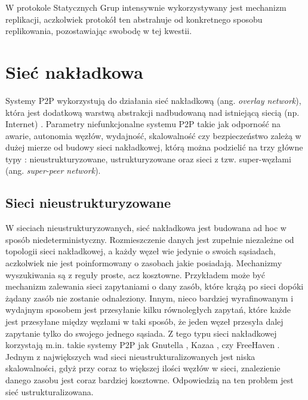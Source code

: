 \documentclass[12pt, twoside, openany]{report}
\begin{document}
W protokole Statycznych Grup intensywnie wykorzystywany jest mechanizm replikacji, aczkolwiek protokół ten abstrahuje od konkretnego sposobu replikowania, pozostawiając swobodę w tej kwestii.


\section{Sieć nakładkowa}
Systemy P2P wykorzystują do działania sieć nakładkową (ang. \textit{overlay network}), która jest dodatkową warstwą abstrakcji nadbudowaną nad istniejącą siecią (np. Internet) \cite{bib:martins, bib:kobusinska}. Parametry niefunkcjonalne systemu P2P takie jak odporność na awarie, autonomia węzłów, wydajność, skalowalność czy bezpieczeństwo zależą w dużej mierze od budowy sieci nakładkowej, którą można podzielić na trzy główne typy \cite{bib:martins}: nieustrukturyzowane, ustrukturyzowane oraz sieci z tzw. super-węzłami (ang. \textit{super-peer network}).

\subsection{Sieci nieustrukturyzowane}
\label{paragraf_sieci_ustrukturyzowane}
W sieciach nieustrukturyzowanych, sieć nakładkowa jest budowana ad hoc w sposób niedeterministyczny. Rozmieszczenie danych jest zupełnie niezależne od topologii sieci nakładkowej, a każdy węzeł wie jedynie o swoich sąsiadach, aczkolwiek nie jest poinformowany o zasobach jakie posiadają. Mechanizmy wyszukiwania są z reguły proste, acz kosztowne. Przykładem może być mechanizm zalewania sieci zapytaniami o dany zasób, które krążą po sieci dopóki żądany zasób nie zostanie odnaleziony. Innym, nieco bardziej wyrafinowanym i wydajnym sposobem jest przesyłanie kilku równoległych zapytań, które każde jest przesyłane między węzłami w taki sposób, że jeden węzeł przesyła dalej zapytanie tylko do swojego jednego sąsiada. Z tego typu sieci nakładkowej korzystają m.in. takie systemy P2P jak Gnutella \cite{bib:gnutella}, Kazaa \cite{bib:kazaa}, czy FreeHaven \cite{bib:freehaven}. Jednym z największych wad sieci nieustrukturalizowanych jest niska skalowalności, gdyż przy coraz to większej ilości węzłów w sieci, znalezienie danego zasobu jest coraz bardziej kosztowne. Odpowiedzią na ten problem jest sieć ustrukturalizowana.
\end{document}
